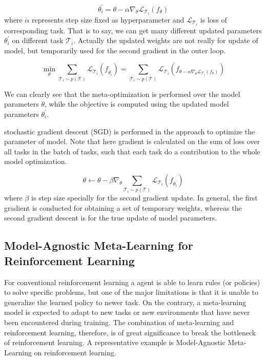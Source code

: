 $$\theta_{i}^{\prime}=\theta-\alpha \nabla_{\theta} \mathcal{L}_{\mathcal{T}_{i}}\left(f_{\theta}\right)$$
where $\alpha$ represents step size fixed as hyperparameter and $\mathcal{L}_{\mathcal{T}_{i}}$ is loss of corresponding task.
That is to say, we can get many different updated parameters $\theta_{i}^{\prime}$ on different task $\mathcal{T}_{i}$. Actually the updated weights are not really for update of model, but temporarily used for the second gradient in the outer loop. 

$$
\min _{\theta} \sum_{\mathcal{T}_{i} \sim p(\mathcal{T})} \mathcal{L}_{\mathcal{T}_{i}}\left(f_{\theta_{i}^{\prime}}\right)=\sum_{\mathcal{T}_{i} \sim p(\mathcal{T})} \mathcal{L}_{\mathcal{T}_{i}}\left(f_{\theta-\alpha \nabla_{\theta} \mathcal{L}_{\mathcal{T}_{i}}\left(f_{\theta}\right)}\right)
$$

We can clearly see that the meta-optimization is performed over the
model parameters $\theta$, while the objective is computed using the updated model parameters $\theta_{i}^{\prime}$.

stochastic gradient descent (SGD) is performed in the approach to optimize the parameter of model. Note that here gradient is calculated on the sum of loss over all tasks in the batch of tasks, such that each task do a contribution to the whole model optimization.

$$
\theta \leftarrow \theta-\beta \nabla_{\theta} \sum_{\mathcal{T}_{i} \sim p(\mathcal{T})} \mathcal{L}_{\mathcal{T}_{i}}\left(f_{\theta_{i}^{\prime}}\right)
$$
where $\beta$ is step size specially for the second gradient update.
In general, the first gradient is conducted for obtaining a set of temporary weights, whereas the second gradient descent is for the true update of model parameters. 

\subsection{Model-Agnostic Meta-Learning for Reinforcement Learning}
For conventional reinforcement learning a agent is able to learn rules (or policies) to solve specific problems, but one of the major limitations is that it is unable to generalize the learned policy to newer task. On the contrary, a meta-learning model is expected to adapt to new tasks or new environments that have never been encountered during training. The combination of meta-learning and reinforcement learning, therefore, is of great significance to break the bottleneck of reinforcement learning. A representative example is Model-Agnostic Meta-Learning on reinforcement learning.

